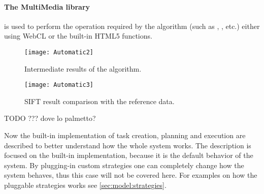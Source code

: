 \paragraph{The MultiMedia library} is used to perform the operation required by
the algorithm (such as , ,  etc.) either
using \ac{WebCL} or the built-in HTML5 functions.
\begin{figure}[htb]
    \centering
    \texttt{[image: Automatic2]}
    \caption{Intermediate results of the algorithm.}
    \label{fig:Automatic2}
\end{figure}

\begin{figure}[htb]
    \centering
    \texttt{[image: Automatic3]}
    \caption{\acs{SIFT} result comparison with the reference data.}
    \label{fig:Automatic3}
\end{figure}














































{\Huge TODO ??? dove lo palmetto?}

Now the built-in implementation of task creation, planning and execution are
described to better understand how the whole system works. The description is
focused on the built-in implementation, because it is the default behavior of
the system. By plugging-in custom strategies one can completely change how the
system behaves, thus this case will not be covered here. For examples on how the
pluggable strategies works see \ref{sec:model:strategies}.

